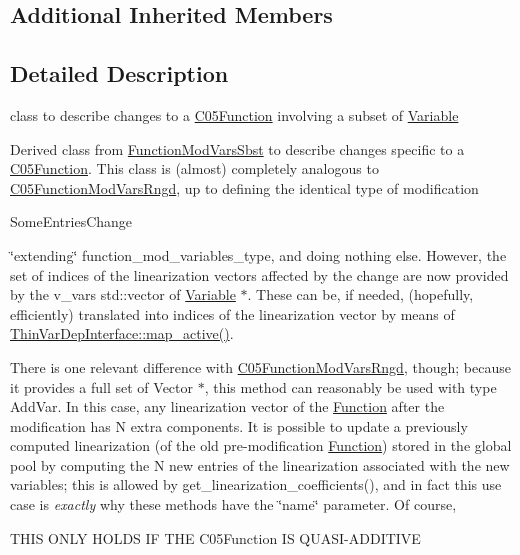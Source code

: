 \subsection*{Additional Inherited Members}


\subsection{Detailed Description}
class to describe changes to a \mbox{\hyperlink{class_s_m_spp__di__unipi__it_1_1_c05_function}{C05\+Function}} involving a subset of \mbox{\hyperlink{class_s_m_spp__di__unipi__it_1_1_variable}{Variable}} 

Derived class from \mbox{\hyperlink{class_s_m_spp__di__unipi__it_1_1_function_mod_vars_sbst}{Function\+Mod\+Vars\+Sbst}} to describe changes specific to a \mbox{\hyperlink{class_s_m_spp__di__unipi__it_1_1_c05_function}{C05\+Function}}. This class is (almost) completely analogous to \mbox{\hyperlink{class_s_m_spp__di__unipi__it_1_1_c05_function_mod_vars_rngd}{C05\+Function\+Mod\+Vars\+Rngd}}, up to defining the identical type of modification


\begin{DoxyItemize}
\item Some\+Entries\+Change
\end{DoxyItemize}

\char`\"{}extending\char`\"{} function\+\_\+mod\+\_\+variables\+\_\+type, and doing nothing else. However, the set of indices of the linearization vectors affected by the change are now provided by the v\+\_\+vars std\+::vector of \mbox{\hyperlink{class_s_m_spp__di__unipi__it_1_1_variable}{Variable}} $\ast$. These can be, if needed, (hopefully, efficiently) translated into indices of the linearization vector by means of \mbox{\hyperlink{group___thin_var_dep_interface___c_l_a_s_s_e_s_ga88e11e9f684f5ac81df04df1cf14a423}{Thin\+Var\+Dep\+Interface\+::map\+\_\+active()}}.

There is one relevant difference with \mbox{\hyperlink{class_s_m_spp__di__unipi__it_1_1_c05_function_mod_vars_rngd}{C05\+Function\+Mod\+Vars\+Rngd}}, though; because it provides a full set of Vector $\ast$, this method can reasonably be used with type Add\+Var. In this case, any linearization vector of the \mbox{\hyperlink{class_s_m_spp__di__unipi__it_1_1_function}{Function}} after the modification has N extra components. It is possible to update a previously computed linearization (of the old pre-\/modification \mbox{\hyperlink{class_s_m_spp__di__unipi__it_1_1_function}{Function}}) stored in the global pool by computing the N new entries of the linearization associated with the new variables; this is allowed by get\+\_\+linearization\+\_\+coefficients(), and in fact this use case is {\itshape exactly} why these methods have the \char`\"{}name\char`\"{} parameter. Of course, \begin{DoxyVerb}THIS ONLY HOLDS IF THE C05Function IS QUASI-ADDITIVE
\end{DoxyVerb}


